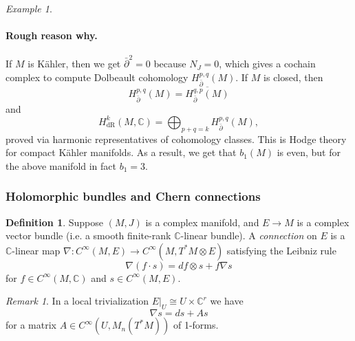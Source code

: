 \documentclass[a4paper]{article}
\theoremstyle{definition}
\newtheorem*{definition}{Definition}
\theoremstyle{remark}
\newtheorem*{example}{Example}
\newtheorem*{remark}{Remark}
\newcommand{\dR}{\text{dR}}
\newcommand{\C}{\mathbb{C}}
\begin{document}
\begin{example}
\begin{itemize}
            \paragraph{Rough reason why.} If $M$ is K\"ahler, then we get
            $\bar\partial^2=0$ because $N_J=0$, which gives a cochain complex to
            compute Dolbeault cohomology $H^{p,q}_{\bar\partial}(M)$. If $M$ is
            closed, then
            \begin{equation*}
                H^{p,q}_{\bar\partial}(M)
                    = \overline{H^{q,p}_{\bar\partial}(M)}
            \end{equation*}
            and
            \begin{equation*}
                H^k_\dR(M,\C) = \bigoplus_{p+q=k}H^{p,q}_{\bar\partial}(M),
            \end{equation*}
            proved via harmonic representatives of cohomology classes. This is
            Hodge theory for compact K\"ahler manifolds. As a result, we get
            that $b_1(M)$ is even, but for the above manifold in fact $b_1=3$.
    \end{itemize}
\end{example}

\subsubsection*{Holomorphic bundles and Chern connections}

\begin{definition}
    Suppose $(M,J)$ is a complex manifold, and $E\to M$ is a complex vector
    bundle (i.e. a smooth finite-rank $\C$-linear bundle). A \emph{connection}
    on $E$ is a $\C$-linear map
    $\nabla:C^\infty(M,E)\to C^\infty(M,T^*M\otimes E)$ satisfying the Leibniz
    rule
    \begin{equation*}
        \nabla(f\cdot s) = df\otimes s + f\nabla s
    \end{equation*}
    for $f\in C^\infty(M,\C)$ and $s\in C^\infty(M,E)$.
\end{definition}

\begin{remark}
    In a local trivialization $E|_U\cong U\times\C^r$ we have
    \begin{equation*}
        \nabla s = ds + As
    \end{equation*}
    for a matrix $A\in C^\infty(U,M_n(T^*M))$ of 1-forms.
\end{remark}
\end{document}
